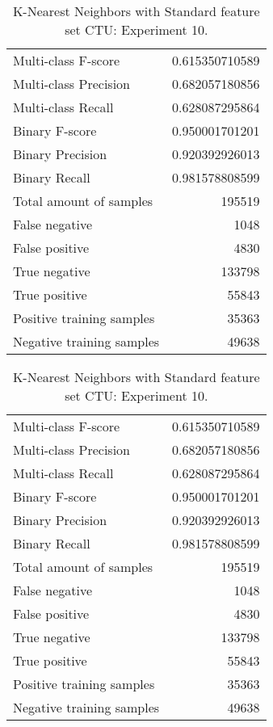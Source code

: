 \begin{table}[H]
\begin{minipage}{0.5\textwidth}
\caption{K-Nearest Neighbors with Standard feature set CTU: Experiment 9.}
\centering
\begin{tabular}{l r}
\toprule
Multi-class F-score & 0.615350710589 \\
Multi-class Precision & 0.682057180856 \\
Multi-class Recall & 0.628087295864 \\
\midrule
Binary F-score & 0.950001701201 \\
Binary Precision & 0.920392926013 \\
Binary Recall & 0.981578808599 \\
\midrule
Total amount of samples & 195519 \\
False negative & 1048 \\
False positive & 4830 \\
True negative & 133798 \\
True positive & 55843 \\
\midrule
Positive training samples & 35363 \\
Negative training samples & 49638 \\
\bottomrule
\end{tabular}
\end{minipage}
\hfillx
\begin{minipage}{0.5\textwidth}
\caption{K-Nearest Neighbors with Standard feature set CTU: Experiment 10.}
\centering
\begin{tabular}{l r}
\toprule
Multi-class F-score & 0.615350710589 \\
Multi-class Precision & 0.682057180856 \\
Multi-class Recall & 0.628087295864 \\
\midrule
Binary F-score & 0.950001701201 \\
Binary Precision & 0.920392926013 \\
Binary Recall & 0.981578808599 \\
\midrule
Total amount of samples & 195519 \\
False negative & 1048 \\
False positive & 4830 \\
True negative & 133798 \\
True positive & 55843 \\
\midrule
Positive training samples & 35363 \\
Negative training samples & 49638 \\
\bottomrule
\end{tabular}
\end{minipage}
\end{table}
